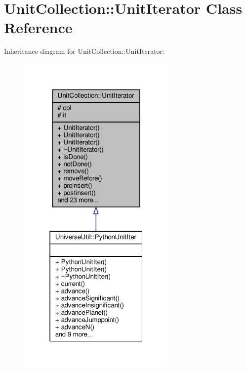 \hypertarget{classUnitCollection_1_1UnitIterator}{}\section{Unit\+Collection\+:\+:Unit\+Iterator Class Reference}
\label{classUnitCollection_1_1UnitIterator}


Inheritance diagram for Unit\+Collection\+:\+:Unit\+Iterator\+:
\nopagebreak
\begin{figure}[H]
\begin{center}
\leavevmode
\includegraphics[width=220pt]{da/dc1/classUnitCollection_1_1UnitIterator__inherit__graph}
\end{center}
\end{figure}


